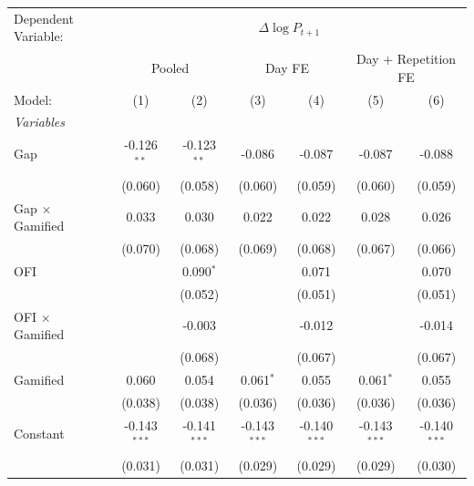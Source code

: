 \begingroup
\centering
\begin{tabular}{lcccccc}
   \tabularnewline \midrule \midrule
   Dependent Variable: & \multicolumn{6}{c}{$\Delta \log P_{t+1}$}\\
    & \multicolumn{2}{c}{Pooled} & \multicolumn{2}{c}{Day FE} & \multicolumn{2}{c}{Day + Repetition FE} \\ 
   Model:                 & (1)            & (2)            & (3)            & (4)            & (5)            & (6)\\  
   \midrule
   \emph{Variables}\\
   Gap                    & -0.126$^{**}$  & -0.123$^{**}$  & -0.086         & -0.087         & -0.087         & -0.088\\   
                          & (0.060)        & (0.058)        & (0.060)        & (0.059)        & (0.060)        & (0.059)\\   
   Gap $\times$ Gamified  & 0.033          & 0.030          & 0.022          & 0.022          & 0.028          & 0.026\\   
                          & (0.070)        & (0.068)        & (0.069)        & (0.068)        & (0.067)        & (0.066)\\   
   OFI                    &                & 0.090$^{*}$    &                & 0.071          &                & 0.070\\   
                          &                & (0.052)        &                & (0.051)        &                & (0.051)\\   
   OFI $\times$ Gamified  &                & -0.003         &                & -0.012         &                & -0.014\\   
                          &                & (0.068)        &                & (0.067)        &                & (0.067)\\   
   Gamified               & 0.060          & 0.054          & 0.061$^{*}$    & 0.055          & 0.061$^{*}$    & 0.055\\   
                          & (0.038)        & (0.038)        & (0.036)        & (0.036)        & (0.036)        & (0.036)\\   
   Constant               & -0.143$^{***}$ & -0.141$^{***}$ & -0.143$^{***}$ & -0.140$^{***}$ & -0.143$^{***}$ & -0.140$^{***}$\\   
                          & (0.031)        & (0.031)        & (0.029)        & (0.029)        & (0.029)        & (0.030)\\   

\end{tabular}
